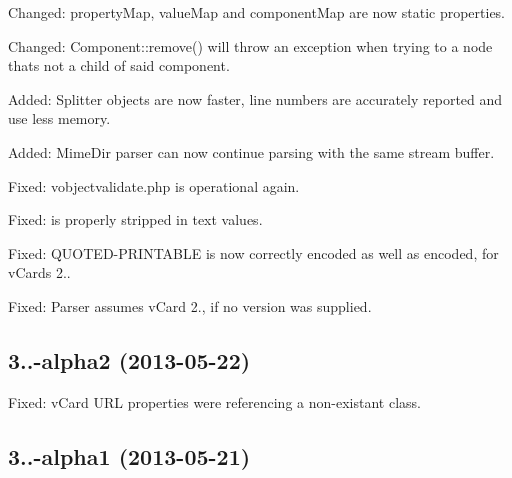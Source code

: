 \begin{DoxyItemize}
\item Changed\+: property\+Map, value\+Map and component\+Map are now static properties.
\item Changed\+: Component\+::remove() will throw an exception when trying to a node that\textquotesingle{}s not a child of said component.
\item Added\+: Splitter objects are now faster, line numbers are accurately reported and use less memory.
\item Added\+: Mime\+Dir parser can now continue parsing with the same stream buffer.
\item Fixed\+: vobjectvalidate.\+php is operational again.
\item Fixed\+:  is properly stripped in text values.
\item Fixed\+: Q\+U\+O\+T\+E\+D-\/\+P\+R\+I\+N\+T\+A\+B\+LE is now correctly encoded as well as encoded, for v\+Cards 2..
\item Fixed\+: Parser assumes v\+Card 2., if no version was supplied.
\end{DoxyItemize}

\subsection*{3..-\/alpha2 (2013-\/05-\/22) }


\begin{DoxyItemize}
\item Fixed\+: v\+Card U\+RL properties were referencing a non-\/existant class.
\end{DoxyItemize}

\subsection*{3..-\/alpha1 (2013-\/05-\/21) }


